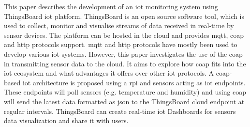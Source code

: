 This paper describes the development of an \gls{iot} monitoring system using
ThingsBoard \gls{iot} platform.
ThingsBoard is an open source software tool, which is used to collect,
monitor and visualise streams of data received in real-time by sensor devices.
The platform can be hosted in the cloud and provides 
\gls{mqtt}, \gls{coap} and \gls{http} protocols support.
\gls{mqtt} and \gls{http} protocols have mostly been used to develop various \gls{iot} systems.
However, this paper investigates the use of the \gls{coap} in transmitting sensor data to the cloud.
It aims to explore how \gls{coap} fits into the \gls{iot} ecosystem and what advantages it offers over other \gls{iot} protocols.
A \gls{coap}-based \gls{iot} architecture is proposed using a \gls{rpi} and sensors acting as \gls{iot} endpoints.
These endpoints will poll sensors (e.g. temperature and humidity) and using \gls{coap} 
will send the latest data formatted as \gls{json} to the ThingsBoard cloud endpoint at regular intervals.
ThingsBoard can create real-time \gls{iot} Dashboards for sensors data visualization and share it with users.